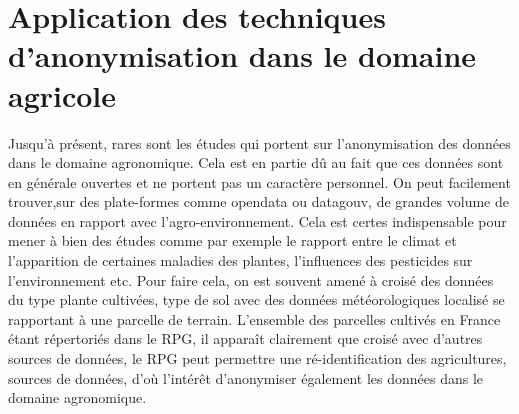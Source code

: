 \chapter{Application des techniques d'anonymisation dans le domaine agricole}
Jusqu'à présent, rares sont les études qui portent sur l'anonymisation des données dans le domaine agronomique.
Cela est en partie dû au fait que ces données sont en générale ouvertes et ne portent pas un caractère personnel. On peut facilement trouver,sur des plate-formes comme opendata ou datagouv, de grandes volume de données en rapport avec l'agro-environnement. Cela est certes indispensable pour mener à bien des études comme par exemple le rapport entre le climat et l'apparition de certaines maladies des plantes, l'influences des pesticides sur l'environnement etc. 
Pour faire cela, on est souvent amené à croisé des données du type plante cultivées, type de sol avec des données météorologiques localisé se rapportant à une parcelle de terrain. L'ensemble des parcelles cultivés en France étant répertoriés dans le \gls{RPG}, il apparaît clairement que croisé avec d'autres sources de données, le RPG peut permettre une ré-identification des agricultures, sources de données, d'où l'intérêt d'anonymiser également les données dans le domaine agronomique.


